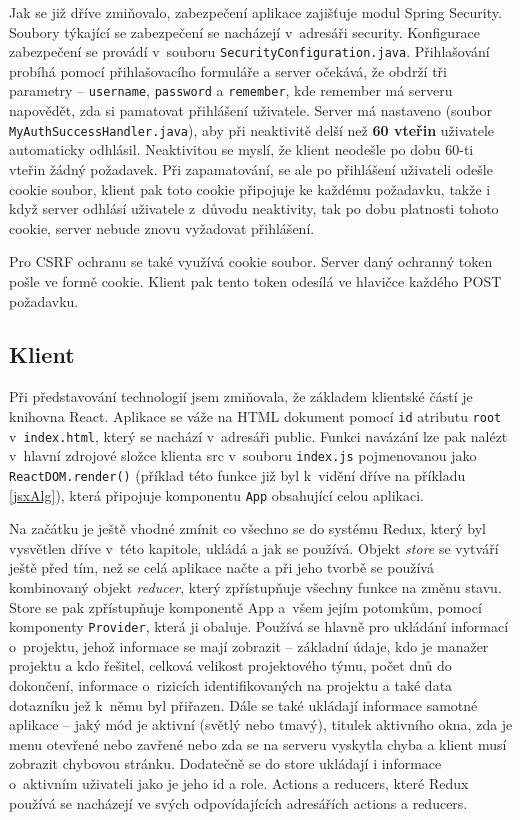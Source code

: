 Jak se již dříve zmiňovalo, zabezpečení aplikace zajišťuje modul Spring Security. Soubory týkající se zabezpečení se nacházejí v~adresáři security. Konfigurace zabezpečení se provádí v~souboru \texttt{SecurityConfiguration.java}. Přihlašování probíhá pomocí přihlašovacího formuláře a server očekává, že obdrží tři parametry – \texttt{username}, \texttt{password} a \texttt{remember}, kde remember má serveru napovědět, zda si pamatovat přihlášení uživatele. Server má nastaveno (soubor \texttt{MyAuthSuccessHandler.java}), aby při neaktivitě delší než \textbf{60 vteřin} uživatele automaticky odhlásil. Neaktivitou se myslí, že klient neodešle po dobu 60-ti vteřin žádný požadavek. Při zapamatování, se ale po přihlášení uživateli odešle cookie soubor, klient pak toto cookie připojuje ke každému požadavku, takže i když server odhlásí uživatele z~důvodu neaktivity, tak po dobu platnosti tohoto cookie, server nebude znovu vyžadovat přihlášení. 

Pro CSRF ochranu se také využívá cookie soubor. Server daný ochranný token pošle ve formě cookie. Klient pak tento token odesílá ve hlavičce každého POST požadavku.



\subsection{Klient}

Při představování technologií jsem zmiňovala, že základem klientské částí je knihovna React. Aplikace se váže na HTML dokument pomocí \texttt{id} atributu \texttt{root} v~\texttt{index.html}, který se nachází v~adresáři public. Funkci navázání lze pak nalézt v~hlavní zdrojové složce klienta src v~souboru \texttt{index.js} pojmenovanou jako \texttt{ReactDOM.render()} (příklad této funkce již byl k~vidění dříve na příkladu \ref{jsxAlg}), která připojuje komponentu \texttt{App} obsahující celou aplikaci.

Na začátku je ještě vhodné zmínit co všechno se do systému Redux, který byl vysvětlen dříve v~této kapitole, ukládá a jak se používá. Objekt \textit{store} se vytváří ještě před tím, než se celá aplikace načte a při jeho tvorbě se používá kombinovaný objekt \textit{reducer}, který zpřístupňuje všechny funkce na změnu stavu. Store se pak zpřístupňuje komponentě App a~všem jejím potomkům, pomocí komponenty \texttt{Provider}, která ji obaluje. Používá se hlavně pro ukládání informací o~projektu, jehož informace se mají zobrazit – základní údaje, kdo je manažer projektu a kdo řešitel, celková velikost projektového týmu, počet dnů do dokončení, informace o~rizicích identifikovaných na projektu a také data dotazníku jež k~němu byl přiřazen. Dále se také ukládají informace samotné aplikace – jaký mód je aktivní (světlý nebo tmavý), titulek aktivního okna, zda je menu otevřené nebo zavřené nebo zda se na serveru vyskytla chyba a klient musí zobrazit chybovou stránku. Dodatečně se do store ukládají i informace o~aktivním uživateli jako je jeho id a role. Actions a reducers, které Redux používá se nacházejí ve svých odpovídajících adresářích actions a reducers. 

